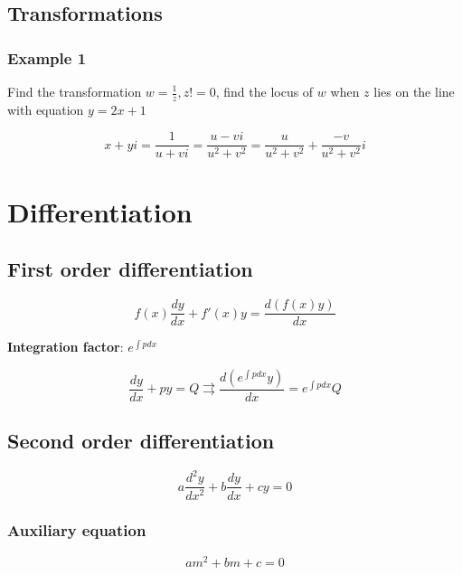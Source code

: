 \documentclass[a4paper,9pt]{scrartcl}
\begin{document}
    \subsection{Transformations}

    \subsubsection{Example 1}
    Find the transformation $w = \frac{1}{z}, z != 0$, find the locus of $w$ when $z$ lies on the line with equation $y = 2x + 1$

    \begin{displaymath}
        x + yi = \frac{1}{u + vi} = \frac{u - vi}{u^2 + v^2} = \frac{u}{u^2+v^2} + \frac{-v}{u^2+v^2}i
    \end{displaymath}


    \section{Differentiation}

    \subsection{First order differentiation}

    \begin{displaymath}
        f(x) \frac{dy}{dx} + f'(x) y = \frac{d(f(x) y )}{dx}
    \end{displaymath}

    \textbf{Integration factor}: $\boxed{e^{\int{p}dx}}$

    \begin{displaymath}
        \frac{dy}{dx}+py=Q \rightrightarrows \frac{d(\boxed{e^{\int{p}dx}}y)}{dx} = \boxed{e^{\int{p}dx}} Q
    \end{displaymath}

    \subsection{Second order differentiation}

    \begin{displaymath}
        a\frac{d^{2}y}{dx^2} + b\frac{dy}{dx} + cy = 0
    \end{displaymath}

    \subsubsection{Auxiliary equation}
    \begin{displaymath}
        am^2 + bm + c = 0
    \end{displaymath}
\end{document}
